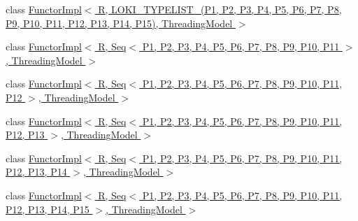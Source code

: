 \begin{DoxyCompactItemize}
\item 
class \hyperlink{classLoki_1_1FunctorImpl_3_01R_00_01_01_01_01_01_01_01_01_01_01_01_01_01_01_01_01_01_01_01_01_01853f8aa60d308affa006585da132e7c8}{Functor\+Impl$<$ R,                                                                           L\+O\+K\+I\+\_\+\+T\+Y\+P\+E\+L\+I\+S\+T\+\_(\+P1, P2, P3, P4, P5, P6, P7, P8, P9, P10, P11, P12, P13,                                                                                                           P14, P15),                                                                           Threading\+Model $>$}
\item 
class \hyperlink{classLoki_1_1FunctorImpl_3_01R_00_01_01_01_01_01_01_01_01_01_01_01_01_01_01_01_01_01_01_01_01_01acd0ecc61da23a0d4d1a550565d161db}{Functor\+Impl$<$ R,                                                                           Seq$<$ P1, P2, P3, P4, P5, P6, P7, P8, P9, P10, P11 $>$,                                                                           Threading\+Model $>$}
\item 
class \hyperlink{classLoki_1_1FunctorImpl_3_01R_00_01_01_01_01_01_01_01_01_01_01_01_01_01_01_01_01_01_01_01_01_011f98edb36b5671b9f4e136a08a7d1f1d}{Functor\+Impl$<$ R,                                                                           Seq$<$ P1, P2, P3, P4, P5, P6, P7, P8, P9, P10, P11, P12 $>$,                                                                           Threading\+Model $>$}
\item 
class \hyperlink{classLoki_1_1FunctorImpl_3_01R_00_01_01_01_01_01_01_01_01_01_01_01_01_01_01_01_01_01_01_01_01_014965e6be24aaa77e42ff93e5d285477f}{Functor\+Impl$<$ R,                                                                           Seq$<$ P1, P2, P3, P4, P5, P6, P7, P8, P9, P10, P11, P12, P13 $>$,                                                                           Threading\+Model $>$}
\item 
class \hyperlink{classLoki_1_1FunctorImpl_3_01R_00_01_01_01_01_01_01_01_01_01_01_01_01_01_01_01_01_01_01_01_01_01d61e3ebe027f187786ba8179102cc4e2}{Functor\+Impl$<$ R,                                                                           Seq$<$ P1, P2, P3, P4, P5, P6, P7, P8, P9, P10, P11, P12, P13,                                                                                                           P14 $>$,                                                                           Threading\+Model $>$}
\item 
class \hyperlink{classLoki_1_1FunctorImpl_3_01R_00_01_01_01_01_01_01_01_01_01_01_01_01_01_01_01_01_01_01_01_01_01f3c1622f2ad04de036a5a92ca27f7142}{Functor\+Impl$<$ R,                                                                           Seq$<$ P1, P2, P3, P4, P5, P6, P7, P8, P9, P10, P11, P12, P13,                                                                                                           P14, P15 $>$,                                                                           Threading\+Model $>$}

\end{DoxyCompactItemize}
